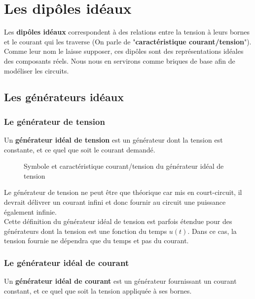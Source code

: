 \chapter{ Les dipôles idéaux }

Les \textbf{dipôles idéaux} correspondent à des relations entre la tension à leurs bornes et le courant qui les traverse (On parle de "\textbf{caractéristique courant/tension}"). Comme leur nom le laisse supposer, ces dipôles sont des représentations idéales des composants réels. Nous nous en servirons comme briques de base afin de modéliser les circuits. 

\section{Les générateurs idéaux}

\subsection{ Le générateur de tension }

Un \textbf{générateur idéal de tension} est un générateur dont la tension est constante, et ce quel que soit le courant demandé.

\begin{figure}[!h]
\begin{center}

\hspace{1cm}

\end{center}
\caption{ Symbole et caractéristique courant/tension du générateur idéal de tension}
\end{figure}

Le générateur de tension ne peut être que théorique car mis en court-circuit, il devrait délivrer un courant infini et donc fournir au circuit une puissance également infinie.\\

Cette définition du générateur idéal de tension est parfois étendue pour des générateurs dont la tension est une fonction du temps $u(t)$. Dans ce cas, la tension fournie ne dépendra que du temps et pas du courant. 

\subsection{ Le générateur idéal de courant }

Un \textbf{générateur idéal de courant} est un générateur fournissant un courant constant, et ce quel que soit la tension appliquée à ses bornes.


